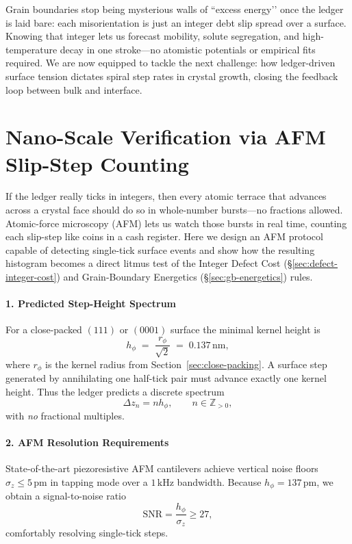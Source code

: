 \documentclass[11pt,oneside]{book}
\begin{document}
Grain boundaries stop being mysterious walls of ``excess energy’’ once the
ledger is laid bare: each misorientation is just an integer debt slip
spread over a surface.  
Knowing that integer lets us forecast mobility, solute segregation, and
high-temperature decay in one stroke—no atomistic potentials or
empirical fits required.
We are now equipped to tackle the next challenge:
how ledger-driven surface tension dictates spiral step rates in crystal
growth, closing the feedback loop between bulk and interface.

\bigskip

\section{Nano-Scale Verification via AFM Slip-Step Counting}
\label{sec:afm-slipstep}



If the ledger really ticks in integers, then every atomic terrace that
advances across a crystal face should do so in whole-number bursts—no
fractions allowed.  
Atomic-force microscopy (AFM) lets us watch those bursts in real time,
counting each slip-step like coins in a cash register.  
Here we design an AFM protocol capable of detecting single-tick surface
events and show how the resulting histogram becomes a direct litmus test
of the Integer Defect Cost (\S\ref{sec:defect-integer-cost}) and
Grain-Boundary Energetics (\S\ref{sec:gb-energetics}) rules.

\paragraph*{1. Predicted Step-Height Spectrum}

For a close-packed \((111)\) or \((0001)\) surface the minimal kernel
height is
\[
   h_\phi \;=\; \frac{r_\phi}{\sqrt{2}} \;=\; 0.137\,\text{nm},
\]
where \(r_\phi\) is the kernel radius from
Section~\ref{sec:close-packing}.  
A surface step generated by annihilating one half-tick pair must advance
exactly one kernel height.  
Thus the ledger predicts a discrete spectrum
\[
   \Delta z_n = n h_\phi, \qquad n\in\mathbb Z_{>0},
\]
with \emph{no} fractional multiples.

\paragraph*{2. AFM Resolution Requirements}

State-of-the-art piezoresistive AFM cantilevers achieve vertical
noise floors \(\sigma_z \le 5\,\text{pm}\) in tapping mode over a
\(1\,\text{kHz}\) bandwidth.  
Because \(h_\phi = 137\,\text{pm}\),
we obtain a signal-to-noise ratio
\[
   \text{SNR} = \frac{h_\phi}{\sigma_z} \ge 27,
\]
comfortably resolving single-tick steps.
\end{document}
